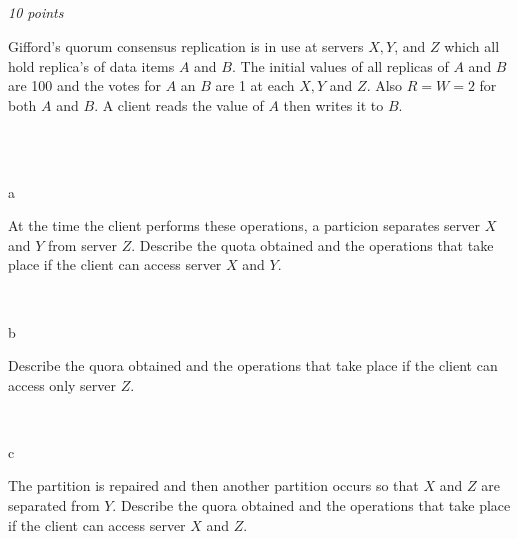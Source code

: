 \documentclass[a4paper]{article}
\newcommand{\points}[1]{\subsection{} \textit{#1 points}\\}
\newcommand{\question}[2][]{
  \noindent
  \parbox[t]{\textwidth}{#1 \parbox[t]{0.95\textwidth}{#2}}\\
}
\begin{document}
\points{10}
\question{Gifford's quorum consensus replication is in use
  at servers $X, Y$, and $Z$ which all hold replica's of data items $A$
  and $B$. The initial values of all replicas of $A$ and $B$ are 100 and
  the votes for $A$ an $B$ are 1 at each $X, Y$ and $Z$. Also $R=W=2$
  for both $A$ and $B$. A client reads the value of $A$ then writes it
  to $B$.}\\
\question[a]{At the time the client performs these
  operations, a particion separates server $X$ and $Y$ from server
  $Z$. Describe the quota obtained and the operations that take place if
  the client can access server $X$ and $Y$.}
\question[b]{Describe the quora obtained and the operations that take
  place if the client can access only server $Z$.}
\question[c]{The partition is repaired and then another partition
  occurs so that $X$ and $Z$ are separated from $Y$. Describe the
  quora obtained and the operations that take place if the client can
  access server $X$ and $Z$.}
\end{document}
